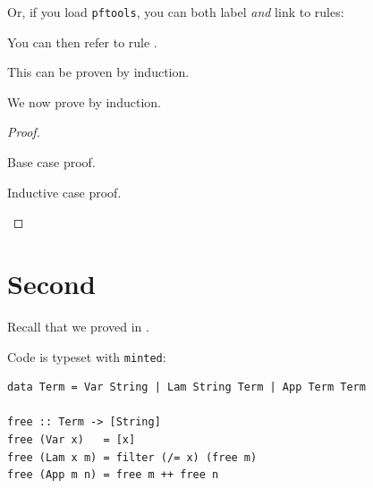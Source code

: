\documentclass{gak-article}
\begin{document}
  Or, if you load \texttt{pftools}, you can both label \emph{and} link to rules:
  You can then refer to rule .
  
  \begin{theorem}
      \label{theorem:induction}
    This can be proven by induction.
  \end{theorem}
  
  We now prove  by induction.
  
  \begin{proof} \hfill
    \begin{indproof}
       Base case proof.

       Inductive case proof.
    \end{indproof}
  \end{proof}

  
\section{Second}

Recall that we proved  in .

Code is typeset with \texttt{minted}:
\begin{verbatim}
data Term = Var String | Lam String Term | App Term Term

free :: Term -> [String]
free (Var x)   = [x]
free (Lam x m) = filter (/= x) (free m)
free (App m n) = free m ++ free n
\end{verbatim}

\lipsum[4]

\printbibliography
\end{document}
